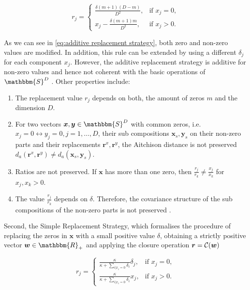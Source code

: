\begin{equation}
r_j = 
\begin{cases}
\frac{\delta(m+1)(D-m)}{D^2}, & \text{if } x_j=0, \\
x_j - \frac{\delta(m+1)m}{D^2}, & \text{if } x_j>0.
\end{cases}
\label{eq:additive replacement strategy}
\end{equation}

As we can see in \ref{eq:additive replacement strategy}, both zero and non-zero values are modified. In addition, this rule can be extended by using a different $\delta_j$ for each component $x_j$. However, the additive replacement strategy is additive for non-zero values and hence not coherent with the basic operations of $\mathbbm{S}^D$ \cite{Josep:2003}. Other properties include:

\begin{enumerate}
	\item The replacement value $r_j$ depends on both, the amount of zeros $m$ and the dimension $D$.
	\item For two vectors $\bm{x},\bm{y} \in \mathbbm{S}^D$ with common zeros, i.e. $x_j= 0 \leftrightarrow y_j=0, j=1,\ldots,D$, their sub compositions $\bm{x}_s,\bm{y}_s$  on their non-zero parts and their replacements $\bm{r}^x,\bm{r}^y$, the Aitchison distance is not preserved $d_a(\bm{r}^x,\bm{r}^y) \neq d_a(\bm{x}_s,\bm{y}_s)$. 
	\item Ratios are not preserved. If $\bm{x}$ has more than one zero, then $\frac{r_j}{r_k} \neq \frac{x_j}{x_k}$ for $x_j,x_k > 0$.
	\item The value $\frac{r_j}{r_k}$ depends on $\delta$. Therefore, the covariance structure of the sub compositions of the non-zero parts is not preserved \cite{Josep:2003}.
\end{enumerate}

Second, the Simple Replacement Strategy, which formalises the procedure of replacing the zeros in $\bm{x}$ with a small positive value $\delta$, obtaining a strictly positive vector $\bm{w} \in \mathbbm{R}_+$ and applying the closure operation $\bm{r}=\mathcal{C}(\bm{w})$

\begin{equation}
r_j = 
\begin{cases}
\frac{\kappa}{\kappa + \sum_{i| x_i=0}\delta_i } \delta_j, & \text{if } x_j=0, \\
\frac{\kappa}{\kappa + \sum_{i| x_i=0}\delta_i } x_j, & \text{if } x_j>0.
\end{cases}
\label{eq:simple replacement strategy}
\end{equation}

